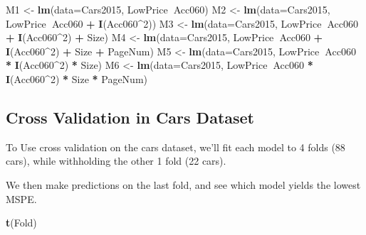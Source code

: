 \documentclass[]{book}
\newenvironment{Shaded}{\begin{snugshade}}{\end{snugshade}}
\newcommand{\KeywordTok}[1]{\textcolor[rgb]{0.13,0.29,0.53}{\textbf{#1}}}
\newcommand{\DataTypeTok}[1]{\textcolor[rgb]{0.13,0.29,0.53}{#1}}
\newcommand{\DecValTok}[1]{\textcolor[rgb]{0.00,0.00,0.81}{#1}}
\newcommand{\StringTok}[1]{\textcolor[rgb]{0.31,0.60,0.02}{#1}}
\newcommand{\OperatorTok}[1]{\textcolor[rgb]{0.81,0.36,0.00}{\textbf{#1}}}
\newcommand{\NormalTok}[1]{#1}
\begin{document}
\begin{Shaded}
\begin{Highlighting}[]
\NormalTok{M1 <-}\StringTok{ }\KeywordTok{lm}\NormalTok{(}\DataTypeTok{data=}\NormalTok{Cars2015, LowPrice}\OperatorTok{~}\NormalTok{Acc060)}
\NormalTok{M2 <-}\StringTok{ }\KeywordTok{lm}\NormalTok{(}\DataTypeTok{data=}\NormalTok{Cars2015, LowPrice}\OperatorTok{~}\NormalTok{Acc060 }\OperatorTok{+}\StringTok{ }\KeywordTok{I}\NormalTok{(Acc060}\OperatorTok{^}\DecValTok{2}\NormalTok{))}
\NormalTok{M3 <-}\StringTok{ }\KeywordTok{lm}\NormalTok{(}\DataTypeTok{data=}\NormalTok{Cars2015, LowPrice}\OperatorTok{~}\NormalTok{Acc060 }\OperatorTok{+}\StringTok{ }\KeywordTok{I}\NormalTok{(Acc060}\OperatorTok{^}\DecValTok{2}\NormalTok{) }\OperatorTok{+}\StringTok{ }\NormalTok{Size)}
\NormalTok{M4 <-}\StringTok{ }\KeywordTok{lm}\NormalTok{(}\DataTypeTok{data=}\NormalTok{Cars2015, LowPrice}\OperatorTok{~}\NormalTok{Acc060 }\OperatorTok{+}\StringTok{ }\KeywordTok{I}\NormalTok{(Acc060}\OperatorTok{^}\DecValTok{2}\NormalTok{) }\OperatorTok{+}\StringTok{ }\NormalTok{Size }\OperatorTok{+}\StringTok{ }\NormalTok{PageNum)}
\NormalTok{M5 <-}\StringTok{ }\KeywordTok{lm}\NormalTok{(}\DataTypeTok{data=}\NormalTok{Cars2015, LowPrice}\OperatorTok{~}\NormalTok{Acc060 }\OperatorTok{*}\StringTok{ }\KeywordTok{I}\NormalTok{(Acc060}\OperatorTok{^}\DecValTok{2}\NormalTok{) }\OperatorTok{*}\StringTok{ }\NormalTok{Size)}
\NormalTok{M6 <-}\StringTok{ }\KeywordTok{lm}\NormalTok{(}\DataTypeTok{data=}\NormalTok{Cars2015, LowPrice}\OperatorTok{~}\NormalTok{Acc060 }\OperatorTok{*}\StringTok{ }\KeywordTok{I}\NormalTok{(Acc060}\OperatorTok{^}\DecValTok{2}\NormalTok{) }\OperatorTok{*}\StringTok{ }\NormalTok{Size }\OperatorTok{*}\StringTok{ }\NormalTok{PageNum)}
\end{Highlighting}
\end{Shaded}

\subsection{Cross Validation in Cars
Dataset}\label{cross-validation-in-cars-dataset}

To Use cross validation on the cars dataset, we'll fit each model to 4
folds (88 cars), while withholding the other 1 fold (22 cars).

We then make predictions on the last fold, and see which model yields
the lowest MSPE.

\begin{Shaded}
\begin{Highlighting}[]
\KeywordTok{t}\NormalTok{(Fold)}
\end{Highlighting}
\end{Shaded}
\end{document}
